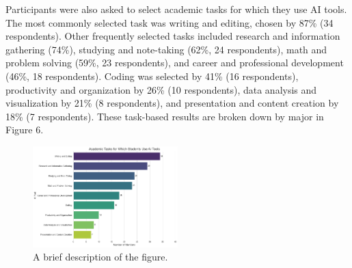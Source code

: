 \documentclass[12pt]{article}
\begin{document}
Participants were also asked to select academic tasks for which they use AI tools. The most commonly selected task was writing and editing, chosen by 87\% (34 respondents). Other frequently selected tasks included research and information gathering (74\%), studying and note-taking (62\%, 24 respondents), math and problem solving (59\%, 23 respondents), and career and professional development (46\%, 18 respondents). Coding was selected by 41\% (16 respondents), productivity and organization by 26\% (10 respondents), data analysis and visualization by 21\% (8 respondents), and presentation and content creation by 18\% (7 respondents). These task-based results are broken down by major in Figure 6. 

\begin{figure}[htbp]
  \centering
  \includegraphics[width=0.5\textwidth]{fig5.png} %
  \caption{A brief description of the figure.}
  \label{fig:example1}
\end{figure}
\end{document}
